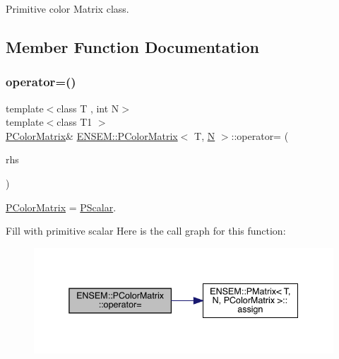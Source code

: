 Primitive color Matrix class. 

\subsection{Member Function Documentation}
\mbox{\label{classENSEM_1_1PColorMatrix_a7750e72b224e47b6a559f3dc112b72d3}} 
\subsubsection{\texorpdfstring{operator=()}{operator=()}\hspace{0.1cm}{\footnotesize\ttfamily [1/6]}}
{\footnotesize\ttfamily template$<$class T , int N$>$ \\
template$<$class T1 $>$ \\
\mbox{\hyperlink{classENSEM_1_1PColorMatrix}{P\+Color\+Matrix}}\& \mbox{\hyperlink{classENSEM_1_1PColorMatrix}{E\+N\+S\+E\+M\+::\+P\+Color\+Matrix}}$<$ T, \mbox{\hyperlink{adat__devel_2lib_2hadron_2operator__name__util_8cc_a7722c8ecbb62d99aee7ce68b1752f337}{N}} $>$\+::operator= (\begin{DoxyParamCaption}\item[{const \mbox{\hyperlink{classENSEM_1_1PScalar}{P\+Scalar}}$<$ T1 $>$ \&}]{rhs }\end{DoxyParamCaption})\hspace{0.3cm}{\ttfamily [inline]}}



\mbox{\hyperlink{classENSEM_1_1PColorMatrix}{P\+Color\+Matrix}} = \mbox{\hyperlink{classENSEM_1_1PScalar}{P\+Scalar}}. 

Fill with primitive scalar Here is the call graph for this function\+:
\nopagebreak
\begin{figure}[H]
\begin{center}
\leavevmode
\includegraphics[width=338pt]{d8/d21/classENSEM_1_1PColorMatrix_a7750e72b224e47b6a559f3dc112b72d3_cgraph}
\end{center}
\end{figure}
\mbox{\label{classENSEM_1_1PColorMatrix_a7750e72b224e47b6a559f3dc112b72d3}} 
